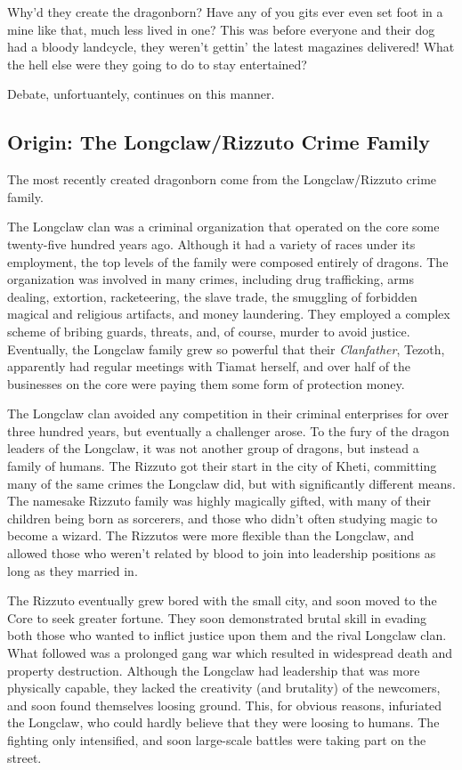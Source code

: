 \begin{multicols}{2}
\begin{itquote}
Why'd they create the dragonborn? Have any of you gits ever even set foot in a mine like that, much less lived in one? This was before everyone and their dog had a bloody landcycle, they weren't gettin' the latest magazines delivered! What the hell else were they going to do to stay entertained?
\end{itquote}

Debate, unfortuantely, continues on this manner.

\subsection{Origin: The Longclaw/Rizzuto Crime Family}
The most recently created dragonborn come from the Longclaw/Rizzuto crime family.

The Longclaw clan was a criminal organization that operated on the core some twenty-five hundred years ago.
Although it had a variety of races under its employment, the top levels of the family were composed entirely of dragons.
The organization was involved in many crimes, including drug trafficking, arms dealing, extortion, racketeering, the slave trade, the smuggling of forbidden magical and religious artifacts, and money laundering.
They employed a complex scheme of bribing guards, threats, and, of course, murder to avoid justice.
Eventually, the Longclaw family grew so powerful that their \textit{Clanfather}, Tezoth, apparently had regular meetings with Tiamat herself, and over half of the businesses on the core were paying them some form of protection money.

The Longclaw clan avoided any competition in their criminal enterprises for over three hundred years, but eventually a challenger arose.
To the fury of the dragon leaders of the Longclaw, it was not another group of dragons, but instead a family of humans.
The Rizzuto got their start in the city of Kheti, committing many of the same crimes the Longclaw did, but with significantly different means.
The namesake Rizzuto family was highly magically gifted, with many of their children being born as sorcerers, and those who didn't often studying magic to become a wizard.
The Rizzutos were more flexible than the Longclaw, and allowed those who weren't related by blood to join into leadership positions as long as they married in.

The Rizzuto eventually grew bored with the small city, and soon moved to the Core to seek greater fortune.
They soon demonstrated brutal skill in evading both those who wanted to inflict justice upon them and the rival Longclaw clan.
What followed was a prolonged gang war which resulted in widespread death and property destruction.
Although the Longclaw had leadership that was more physically capable, they lacked the creativity (and brutality) of the newcomers, and soon found themselves loosing ground.
This, for obvious reasons, infuriated the Longclaw, who could hardly believe that they were loosing to humans.
The fighting only intensified, and soon large-scale battles were taking part on the street.


\end{multicols}
